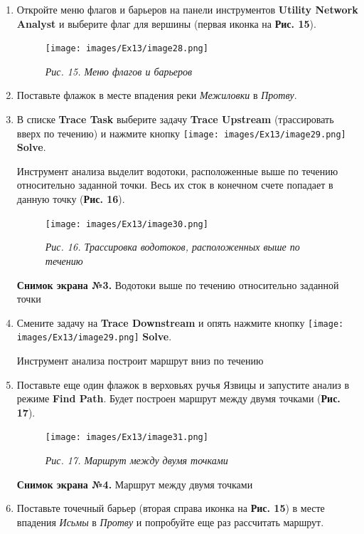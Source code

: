 \documentclass[12pt,]{book}
\begin{document}
\begin{enumerate}
\def\labelenumi{\arabic{enumi}.}
\item
  Откройте меню флагов и барьеров на панели инструментов \textbf{Utility Network Analyst} и выберите флаг для вершины (первая иконка на \textbf{Рис. 15}).

  \begin{figure}
  \centering
  \texttt{[image: images/Ex13/image28.png]}
  \caption{\emph{Рис. 15. Меню флагов и барьеров}}
  \end{figure}
\item
  Поставьте флажок в месте впадения реки \emph{Межиловки} в \emph{Протву}.
\item
  В списке \textbf{Trace Task} выберите задачу \textbf{Trace Upstream} (трассировать вверх по течению) и нажмите кнопку \texttt{[image: images/Ex13/image29.png]} \textbf{Solve}.

  Инструмент анализа выделит водотоки, расположенные выше по течению относительно заданной точки. Весь их сток в конечном счете попадает в данную точку (\textbf{Рис. 16}).

  \begin{figure}
  \centering
  \texttt{[image: images/Ex13/image30.png]}
  \caption{\emph{Рис. 16. Трассировка водотоков, расположенных выше по течению}}
  \end{figure}

  \textbf{Снимок экрана №3.} Водотоки выше по течению относительно заданной точки
\item
  Смените задачу на \textbf{Trace Downstream} и опять нажмите кнопку \texttt{[image: images/Ex13/image29.png]} \textbf{Solve}.

  Инструмент анализа построит маршрут вниз по течению
\item
  Поставьте еще один флажок в верховьях ручья Язвицы и запустите анализ в режиме \textbf{Find Path}. Будет построен маршрут между двумя точками (\textbf{Рис. 17}).

  \begin{figure}
  \centering
  \texttt{[image: images/Ex13/image31.png]}
  \caption{\emph{Рис. 17. Маршрут между двумя точками}}
  \end{figure}

  \textbf{Снимок экрана №4.} Маршрут между двумя точками
\item
  Поставьте точечный барьер (вторая справа иконка на \textbf{Рис. 15}) в месте впадения \emph{Исьмы} в \emph{Протву} и попробуйте еще раз рассчитать маршрут.


\end{enumerate}
\end{document}
